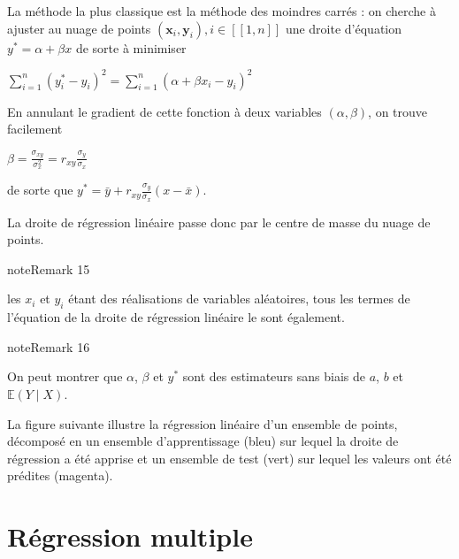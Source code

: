 \documentclass[letterpaper,10pt,english]{jupyterBook}
\begin{document}
\sphinxAtStartPar
La méthode la plus classique est la méthode des moindres carrés : on cherche à ajuster au nuage de points  \((\mathbf x_i,\mathbf y_i),i\in[\![1,n]\!]\) une droite d’équation \(y^*=\alpha +\beta x\) de sorte à minimiser

\sphinxAtStartPar
\(\displaystyle\sum_{i=1}^n (y_i^*-y_i)^2 = \displaystyle\sum_{i=1}^n (\alpha + \beta x_i-y_i)^2\)

\sphinxAtStartPar
En annulant le gradient de cette fonction à deux variables \((\alpha,\beta)\), on trouve facilement

\sphinxAtStartPar
\(\beta = \frac{\sigma_{xy}}{\sigma_x^2} = r_{xy}\frac{\sigma_y}{\sigma_x}\)

\sphinxAtStartPar
de sorte que \(y^* = \bar y + r_{xy}\frac{\sigma_y}{\sigma_x}(x-\bar x)\).

\sphinxAtStartPar
La droite de régression linéaire passe donc par le centre de masse du nuage de points.
\label{regression:remark-2}
\begin{sphinxadmonition}{note}{Remark 15}



\sphinxAtStartPar
les \(x_i\) et \(y_i\) étant des réalisations de variables aléatoires, tous les termes de l’équation de la droite de régression linéaire le sont également.
\end{sphinxadmonition}
\label{regression:remark-3}
\begin{sphinxadmonition}{note}{Remark 16}



\sphinxAtStartPar
On peut montrer que \(\alpha\), \(\beta\) et \(y^*\) sont des estimateurs sans biais de \(a\), \(b\) et \(\mathbb{E}(Y\mid X)\).
\end{sphinxadmonition}

\sphinxAtStartPar
La figure suivante illustre la régression linéaire d’un ensemble de points, décomposé en un ensemble d’apprentissage (bleu) sur lequel la droite de régression a été apprise et un ensemble de test (vert) sur lequel les valeurs ont été prédites (magenta).

\sphinxAtStartPar
{}


\section{Régression multiple}
\label{\detokenize{regression:regression-multiple}}
\ignorespaces 
\end{document}
